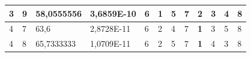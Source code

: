 \documentclass[conference]{IEEEtran}
\begin{document}
\begin{table}[]
\begin{tabular}{|llll|llllllll|}
\multicolumn{1}{|l|}{3}                                                     & \multicolumn{1}{l|}{9}                                                        & \multicolumn{1}{l|}{58,0555556}                                                   & 3,6859E-10                     & \multicolumn{1}{l|}{6}                                                  & \multicolumn{1}{l|}{\textbf{1}}                                         & \multicolumn{1}{l|}{5}                                                  & \multicolumn{1}{l|}{7}                                                  & \multicolumn{1}{l|}{2}                                                  & \multicolumn{1}{l|}{3}                                                  & \multicolumn{1}{l|}{4}                                                  & 8                          \\ \hline
\multicolumn{1}{|l|}{4}                                                     & \multicolumn{1}{l|}{7}                                                        & \multicolumn{1}{l|}{63,6}                                                         & 2,8728E-11                     & \multicolumn{1}{l|}{6}                                                  & \multicolumn{1}{l|}{2}                                                  & \multicolumn{1}{l|}{4}                                                  & \multicolumn{1}{l|}{7}                                                  & \multicolumn{1}{l|}{\textbf{1}}                                         & \multicolumn{1}{l|}{3}                                                  & \multicolumn{1}{l|}{5}                                                  & 8                          \\ \hline
\multicolumn{1}{|l|}{4}                                                     & \multicolumn{1}{l|}{8}                                                        & \multicolumn{1}{l|}{65,7333333}                                                   & 1,0709E-11                     & \multicolumn{1}{l|}{6}                                                  & \multicolumn{1}{l|}{2}                                                  & \multicolumn{1}{l|}{5}                                                  & \multicolumn{1}{l|}{7}                                                  & \multicolumn{1}{l|}{\textbf{1}}                                         & \multicolumn{1}{l|}{4}                                                  & \multicolumn{1}{l|}{3}                                                  & 8                          \\ \hline

\end{tabular}
\end{table}
\end{document}
